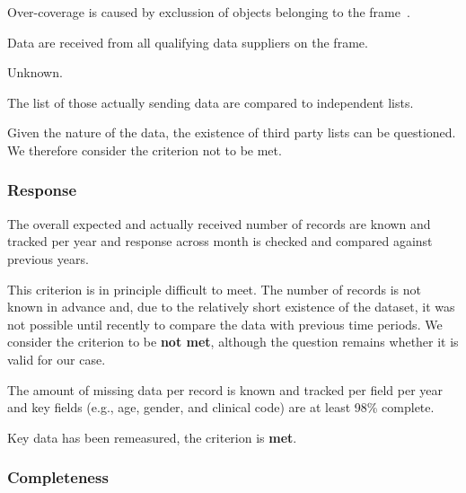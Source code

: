 Over-coverage is caused by exclussion of objects belonging to the frame~\cite{under-coverage}.

\begin{QandA}
    \item Data are received from all qualifying data suppliers on the frame.
    \begin{answered}
        Unknown.
    \end{answered}

    \item The list of those actually sending data are compared to independent lists.
    \begin{answered}
        Given the nature of the data, the existence of third party lists can be questioned.
        We therefore consider the criterion not to be met.
    \end{answered}

\end{QandA}

\subsubsection{Response}

\begin{QandA}
    \item The overall expected and actually received number of records are known and tracked per year and response across month is checked and compared against previous years.
    \begin{answered}
        This criterion is in principle difficult to meet.
        The number of records is not known in advance and, due to the relatively short existence of the dataset, it was not possible until recently to compare the data with previous time periods.
        We consider the criterion to be \textbf{not met}, although the question remains whether it is valid for our case.
    \end{answered}

    \item The amount of missing data per record is known and tracked per field per year and key fields (e.g., age, gender, and clinical code) are at least 98\% complete.
    \begin{answered}
        Key data has been remeasured, the criterion is \textbf{met}.
    \end{answered}

\end{QandA}

\subsubsection{Completeness}

